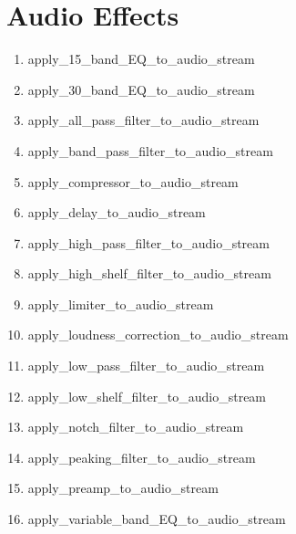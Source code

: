 \section{Audio Effects}

\begin{enumerate}

\item apply\_15\_band\_EQ\_to\_audio\_stream
\item apply\_30\_band\_EQ\_to\_audio\_stream
\item apply\_all\_pass\_filter\_to\_audio\_stream
\item apply\_band\_pass\_filter\_to\_audio\_stream
\item apply\_compressor\_to\_audio\_stream
\item apply\_delay\_to\_audio\_stream
\item apply\_high\_pass\_filter\_to\_audio\_stream
\item apply\_high\_shelf\_filter\_to\_audio\_stream
\item apply\_limiter\_to\_audio\_stream
\item apply\_loudness\_correction\_to\_audio\_stream
\item apply\_low\_pass\_filter\_to\_audio\_stream
\item apply\_low\_shelf\_filter\_to\_audio\_stream
\item apply\_notch\_filter\_to\_audio\_stream
\item apply\_peaking\_filter\_to\_audio\_stream
\item apply\_preamp\_to\_audio\_stream
\item apply\_variable\_band\_EQ\_to\_audio\_stream

\end{enumerate}